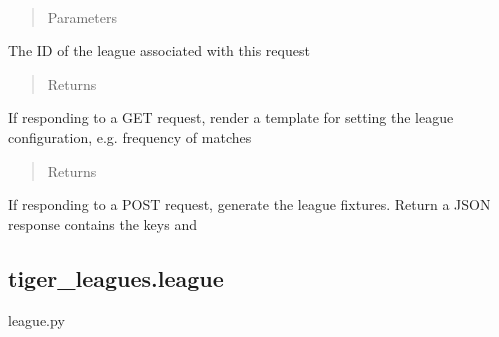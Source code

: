 \documentclass[letterpaper,10pt,english]{sphinxmanual}
\begin{document}
\begin{fulllineitems}
\label{\detokenize{tiger_leagues/readme:tiger_leagues.admin.start_league}}~\begin{quote}\begin{description}
\item[{Parameters}] \leavevmode
{} \textendash{} 

\end{description}\end{quote}

The ID of the league associated with this request
\begin{quote}\begin{description}
\item[{Returns}] \leavevmode
{}

\end{description}\end{quote}

If responding to a GET request, render a template for setting the league 
configuration, e.g. frequency of matches
\begin{quote}\begin{description}
\item[{Returns}] \leavevmode
{}

\end{description}\end{quote}

If responding to a POST request, generate the league fixtures. Return a 
JSON response contains the keys  and 

\end{fulllineitems}



\subsection{tiger\_leagues.league}
\label{\detokenize{tiger_leagues/readme:module-tiger_leagues.league}}\label{\detokenize{tiger_leagues/readme:tiger-leagues-league}}
league.py
\end{document}

